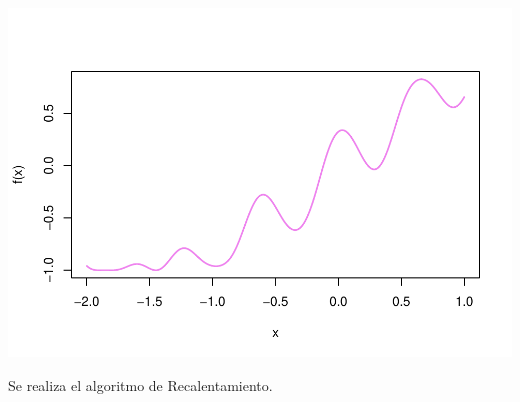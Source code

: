 \documentclass[
]{article}
\begin{document}
\includegraphics{tarea2_files/figure-latex/unnamed-chunk-12-1.pdf}

Se realiza el algoritmo de Recalentamiento.
\end{document}
